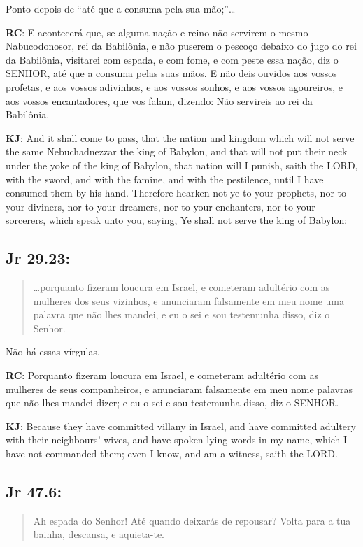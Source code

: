 Ponto depois de ``até que a consuma pela sua mão;''\ldots

\textbf{RC}: E acontecerá que, se alguma nação e reino não servirem o mesmo Nabucodonosor, rei da Babilônia, e não puserem o pescoço debaixo do jugo do rei da Babilônia, visitarei com espada, e com fome, e com peste essa nação, diz o SENHOR, até que a consuma pelas suas mãos. E não deis ouvidos aos vossos profetas, e aos vossos adivinhos, e aos vossos sonhos, e aos vossos agoureiros, e aos vossos encantadores, que vos falam, dizendo: Não servireis ao rei da Babilônia.

\textbf{KJ}: And it shall come to pass, that the nation and kingdom which will not serve the same Nebuchadnezzar the king of Babylon, and that will not put their neck under the yoke of the king of Babylon, that nation will I punish, saith the LORD, with the sword, and with the famine, and with the pestilence, until I have consumed them by his hand. Therefore hearken not ye to your prophets, nor to your diviners, nor to your dreamers, nor to your enchanters, nor to your sorcerers, which speak unto you, saying, Ye shall not serve the king of Babylon:

\subsection*{Jr 29.23:} 
 \begin{quote}
  \small
 \ldots porquanto fizeram loucura em Israel, e cometeram adultério com as mulheres dos seus vizinhos, e anunciaram falsamente\uwave{,} em meu nome uma palavra\uwave{,} que não lhes mandei, e eu o sei e sou testemunha disso, diz o Senhor.
 \end{quote}

Não há essas vírgulas.

\textbf{RC}: Porquanto fizeram loucura em Israel, e cometeram adultério com as mulheres de seus companheiros, e anunciaram falsamente em meu nome palavras que não lhes mandei dizer; e eu o sei e sou testemunha disso, diz o SENHOR.

\textbf{KJ}: Because they have committed villany in Israel, and have committed adultery with their neighbours’ wives, and have spoken lying words in my name, which I have not commanded them; even I know, and am a witness, saith the LORD.

\subsection*{Jr 47.6:} 
 \begin{quote}
  \small
 Ah\uwave{;} espada do Senhor! Até quando deixarás de repousar? Volta para a tua bainha, descansa, e aquieta-te.
 \end{quote}


